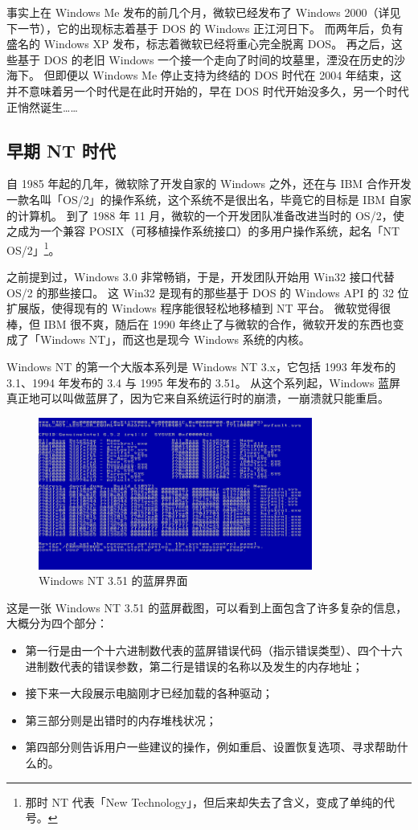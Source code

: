 事实上在 Windows Me 发布的前几个月，微软已经发布了 Windows 2000（详见下一节），它的出现标志着基于 DOS 的 Windows 正江河日下。
而两年后，负有盛名的 Windows XP 发布，标志着微软已经将重心完全脱离 DOS。
再之后，这些基于 DOS 的老旧 Windows 一个接一个走向了时间的坟墓里，湮没在历史的沙海下。
但即便以 Windows Me 停止支持为终结的 DOS 时代在 2004 年结束，这并不意味着另一个时代是在此时开始的，早在 DOS 时代开始没多久，另一个时代正悄然诞生……

\subsection{早期 NT 时代}

自 1985 年起的几年，微软除了开发自家的 Windows 之外，还在与 IBM 合作开发一款名叫「OS/2」的操作系统，这个系统不是很出名，毕竟它的目标是 IBM 自家的计算机。
到了 1988 年 11 月，微软的一个开发团队准备改进当时的 OS/2，使之成为一个兼容 POSIX（可移植操作系统接口）的多用户操作系统，起名「NT OS/2」\footnote{那时 NT 代表「New Technology」，但后来却失去了含义，变成了单纯的代号。}。

之前提到过，Windows 3.0 非常畅销，于是，开发团队开始用 Win32 接口代替 OS/2 的那些接口。
这 Win32 是现有的那些基于 DOS 的 Windows API 的 32 位扩展版，使得现有的 Windows 程序能很轻松地移植到 NT 平台。
微软觉得很棒，但 IBM 很不爽，随后在 1990 年终止了与微软的合作，微软开发的东西也变成了「Windows NT」，而这也是现今 Windows 系统的内核。

Windows NT 的第一个大版本系列是 Windows NT 3.x，它包括 1993 年发布的 3.1、1994 年发布的 3.4 与 1995 年发布的 3.51。
从这个系列起，Windows 蓝屏真正地可以叫做蓝屏了，因为它来自系统运行时的崩溃，一崩溃就只能重启。

\begin{figure}[htb!]
  \centering
  \includegraphics[width=9cm]{assets/Win-NT-3.51-BSoD.png}
  \caption{Windows NT 3.51 的蓝屏界面}
  \label{Win-NT-3.51-BSoD}
\end{figure}

这是一张 Windows NT 3.51 的蓝屏截图，可以看到上面包含了许多复杂的信息，大概分为四个部分：
\begin{itemize}
  \item 第一行是由一个十六进制数代表的蓝屏错误代码（指示错误类型）、四个十六进制数代表的错误参数，第二行是错误的名称以及发生的内存地址；
  \item 接下来一大段展示电脑刚才已经加载的各种驱动；
  \item 第三部分则是出错时的内存堆栈状况；
  \item 第四部分则告诉用户一些建议的操作，例如重启、设置恢复选项、寻求帮助什么的。
\end{itemize}

